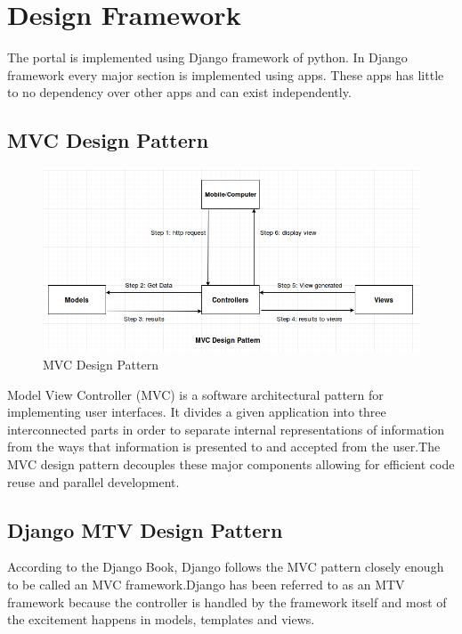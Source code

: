\chapter{Design Framework}
The portal is implemented using Django framework of python. In Django framework every major section is implemented using apps. These apps has little to no dependency over other apps and can exist independently.

\section{MVC Design Pattern}

\begin{figure}[htp]
\center
\includegraphics[width=1.0\columnwidth]{mvc}
\caption{MVC Design Pattern}
\label{fig:MVC Design Pattern}
\end{figure}

Model View Controller (MVC) is a software architectural pattern for implementing user interfaces. It divides a given application into three interconnected parts in order to separate internal representations of information from the ways that information is presented to and accepted from the user.The MVC design pattern decouples these major components allowing for efficient code reuse and parallel development.


\section{Django MTV Design Pattern}
According to the Django Book, Django follows the MVC pattern closely enough to be called an MVC framework.Django has been referred to as an MTV framework because the controller is handled by the framework itself and most of the excitement happens in models, templates and views.


